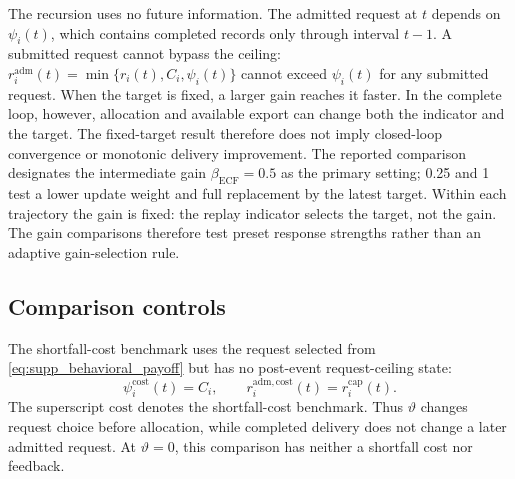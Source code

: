 \documentclass[11pt]{article}
\begin{document}
The recursion uses no future information. The admitted request at $t$ depends on
$\psi_i(t)$, which contains completed records only through interval $t-1$.
A submitted request cannot bypass the ceiling:
$r_i^{\mathrm{adm}}(t)=\min\{r_i(t),C_i,\psi_i(t)\}$ cannot exceed $\psi_i(t)$ for any
submitted request. When the target is fixed, a larger gain reaches it faster.
In the complete loop, however, allocation and available export can change both
the indicator and the target. The fixed-target result therefore does not imply
closed-loop convergence or monotonic delivery improvement. The reported comparison designates the intermediate gain
$\beta_{\mathrm{ECF}}=0.5$ as the primary setting; 0.25 and 1 test a lower
update weight and full replacement by the latest target.
Within each trajectory the gain is fixed: the replay indicator selects the
target, not the gain. The gain comparisons therefore test preset response
strengths rather than an adaptive gain-selection rule.

\subsection{Comparison controls}

The shortfall-cost benchmark uses the request selected from
\eqref{eq:supp_behavioral_payoff} but has no post-event request-ceiling state:
\begin{equation}
\psi_i^{\mathrm{cost}}(t)=C_i,
\qquad
r_i^{\mathrm{adm,cost}}(t)=r_i^{\mathrm{cap}}(t).
\label{eq:supp_shortfall_cost_control}
\end{equation}
The superscript $\mathrm{cost}$ denotes the shortfall-cost benchmark.
Thus $\vartheta$ changes request choice before allocation, while completed
delivery does not change a later admitted request. At $\vartheta=0$, this
comparison has neither a shortfall cost nor feedback.
\end{document}

